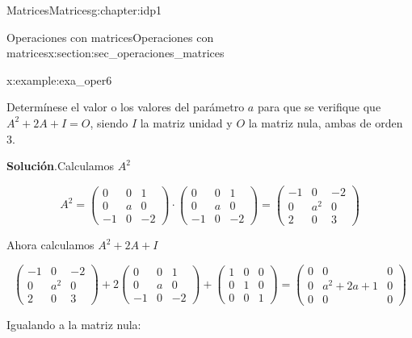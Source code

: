 \documentclass[oneside,12pt,]{book}
\newcommand{\blocktitlefont}{\relax}
\newcommand{\amp}{&}
\begin{document}
\begin{chapterptx}{Matrices}{}{Matrices}{}{}{g:chapter:idp1}
\begin{sectionptx}{Operaciones con matrices}{}{Operaciones con matrices}{}{}{x:section:sec_operaciones_matrices}
\begin{example}{}{x:example:exa_oper6}
\par
Determínese el valor o los valores del parámetro \(a\) para que se verifique que \(A^2+2A+I=O\), siendo \(I\) la matriz unidad y \(O\) la matriz nula, ambas de orden 3.%
\par\smallskip%
\noindent\textbf{\blocktitlefont Solución}.\hypertarget{g:solution:idp14}{}\quad{}Calculamos \(A^2\)%
\par
%
\begin{equation*}
A^2
=
\begin{pmatrix}
0 \amp 0 \amp 1 \\
0 \amp a \amp 0 \\
-1 \amp 0 \amp -2 
\end{pmatrix}\cdot
\begin{pmatrix}
0 \amp 0 \amp 1 \\
0 \amp a \amp 0 \\
-1 \amp 0 \amp -2 
\end{pmatrix}= 
\begin{pmatrix}
-1 \amp 0 \amp -2 \\
0 \amp a^2 \amp 0 \\
2 \amp 0 \amp 3 
\end{pmatrix}
\end{equation*}
%
\par
Ahora calculamos \(A^2+2A+I\)%
\par
%
\begin{equation*}
\begin{pmatrix}
-1 \amp 0 \amp -2 \\
0 \amp a^2 \amp 0 \\
2 \amp 0 \amp 3 
\end{pmatrix} 
+
2
\begin{pmatrix}
0 \amp 0 \amp 1 \\
0 \amp a \amp 0 \\
-1 \amp 0 \amp -2 
\end{pmatrix}+
\begin{pmatrix}
1 \amp 0 \amp 0 \\
0 \amp 1 \amp 0 \\
0 \amp 0 \amp 1
\end{pmatrix}=
\begin{pmatrix}
0 \amp 0 \amp 0 \\
0 \amp a^2+2a+1 \amp 0 \\
0 \amp 0 \amp 0 
\end{pmatrix}
\end{equation*}
%
\par
Igualando a la matriz nula:%

\end{example}
\end{sectionptx}
\end{chapterptx}
\end{document}
